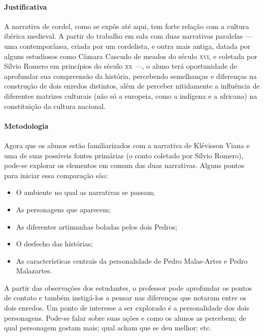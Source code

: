 \documentclass[11pt]{extarticle}
\begin{document}
\paragraph{Justificativa} A narrativa de cordel, como se expôs até aqui, tem forte relação com a cultura ibérica medieval. A partir do trabalho em sala com duas narrativas paralelas --- uma contemporânea, criada por um cordelista, e outra mais antiga, datada por alguns estudiosos como Câmara Cascudo de meados do século \textsc{xvi}, e coletada por Sílvio Romero em princípios do século \textsc{xx} ---, o aluno terá oportunidade de aprofundar sua compreensão da história, percebendo semelhanças e diferenças na construção de dois enredos distintos, além de perceber nitidamente a influência de diferentes matrizes culturais (não só a europeia, como a indígena e a africana) na constituição da cultura nacional.


\paragraph{Metodologia} Agora que os alunos estão familiarizados com a narrativa de Klévisson Viana e uma de suas possíveis fontes primárias (o conto coletado por Sílvio Romero), pode-se explorar os elementos em comum das duas narrativas.
Alguns pontos para iniciar essa comparação são:

\begin{itemize}
\item O ambiente no qual as narrativas se passam;

\item As personagens que aparecem;

\item As diferentes artimanhas boladas pelos dois Pedros;

\item O desfecho das histórias;

\item As características centrais da personalidade de Pedro Malas-Artes e Pedro Malazartes.
\end{itemize}

A partir das observações dos estudantes, o professor pode aprofundar os pontos de contato e também instigá-los a pensar nas diferenças que notaram entre os dois enredos.
Um ponto de interesse a ser explorado é a personalidade dos dois personagens.
Pode-se falar sobre suas ações e como os alunos as percebem; de qual personagem gostam mais; qual acham que se deu melhor; etc.
\end{document}
